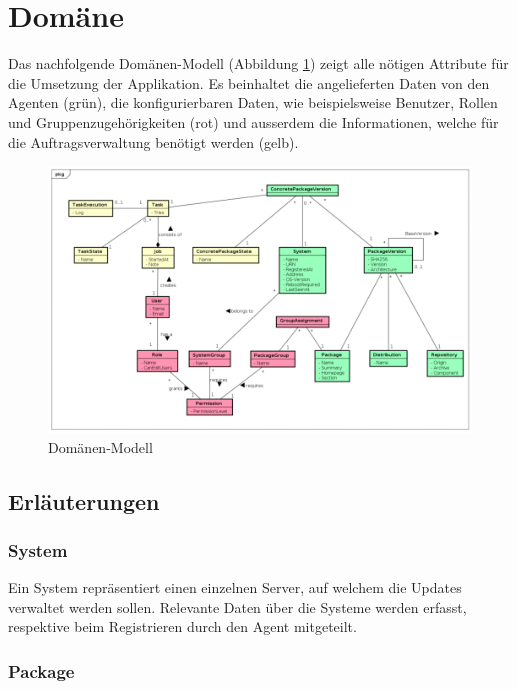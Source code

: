 \section{Domäne}

Das nachfolgende Domänen-Modell (Abbildung \ref{fig:domainmodel}) zeigt alle nötigen Attribute für die Umsetzung der Applikation. Es beinhaltet die angelieferten Daten von den Agenten (grün), die konfigurierbaren Daten, wie beispielsweise Benutzer, Rollen und Gruppenzugehörigkeiten (rot) und ausserdem die Informationen, welche für die Auftragsverwaltung benötigt werden (gelb).

\begin{figure}
  \centering
    \includegraphics[width=\textwidth]{files/DomainModel_small}
  \caption{Domänen-Modell}
  \label{fig:domainmodel}
\end{figure}

\subsection*{Erläuterungen}

\subsubsection{System}

Ein System repräsentiert einen einzelnen Server, auf welchem die Updates verwaltet werden sollen. Relevante Daten über die Systeme werden erfasst, respektive beim Registrieren durch den Agent mitgeteilt.

\subsubsection{Package}

